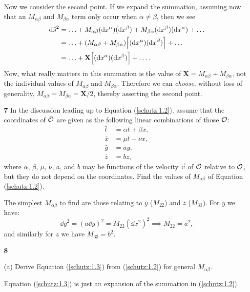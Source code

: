 \documentclass[gr-notes.tex]{subfiles}
\begin{document}
Now we consider the second point. If we expand the summation, assuming now that an $M_{\alpha\beta}$ and $M_{\beta\alpha}$ term only occur when $\alpha \neq \beta$, then we see
%
\begin{align*}
  \dd{\bar{s}}^2 &=
  \ldots +
  M_{\alpha\beta} (\dd{x^\alpha}) (\dd{x^\beta}) +
  M_{\beta\alpha} (\dd{x^\beta}) (\dd{x^\alpha}) +
  \ldots
  \\ &=
  \ldots +
  (M_{\alpha\beta} + M_{\beta\alpha}) \qty[ (\dd{x^\alpha}) (\dd{x^\beta}) ] +
  \ldots
  \\ &=
  \ldots +
  \mathbf{X} \qty[ (\dd{x^\alpha}) (\dd{x^\beta}) ] +
  \ldots.
\end{align*}
%
Now, what really matters in this summation is the value of $\mathbf{X} = M_{\alpha\beta} + M_{\beta\alpha}$, not the individual values of $M_{\alpha\beta}$ and $M_{\beta\alpha}$. Therefore we can \emph{choose}, without loss of generality, $M_{\alpha\beta} = M_{\beta\alpha} = \mathbf{X}/2$, thereby asserting the second point.


\textbf{7}
In the discussion leading up to Equation (\ref{schutz:1.2}), assume that the coordinates of $\bar{\mathcal{O}}$ are given as the following linear combinations of those $\mathcal{O}$:
%
\begin{align*}
  \bar{t} &= \alpha t + \beta x,
  \\
  \bar{x} &= \mu t + \nu x,
  \\
  \bar{y} &= a y,
  \\
  \bar{z} &= b z,
\end{align*}
%
where $\alpha$, $\beta$, $\mu$, $\nu$, $a$, and $b$ may be functions of the velocity $\vec{v}$ of $\bar{\mathcal{O}}$ relative to $\mathcal{O}$, but they do not depend on the coordinates. Find the values of $M_{\alpha\beta}$ of Equation (\ref{schutz:1.2}).

The simplest $M_{\alpha\beta}$ to find are those relating to $\bar{y}$ ($M_{22}$) and $\bar{z}$ ($M_{33}$). For $\bar{y}$ we have:
%
\begin{displaymath}
  \dd{\bar{y}}^2 = (a \dd{y})^2 = M_{22} (\dd{x^2})^2
  \implies
  M_{22} = a^2,
\end{displaymath}
%
and similarly for $z$ we have $M_{33} = b^2$.


\textbf{8}

(a) Derive Equation (\ref{schutz:1.3}) from (\ref{schutz:1.2}) for general $M_{\alpha\beta}$.

Equation (\ref{schutz:1.3}) is just an expansion of the summation in (\ref{schutz:1.2}).
\end{document}
